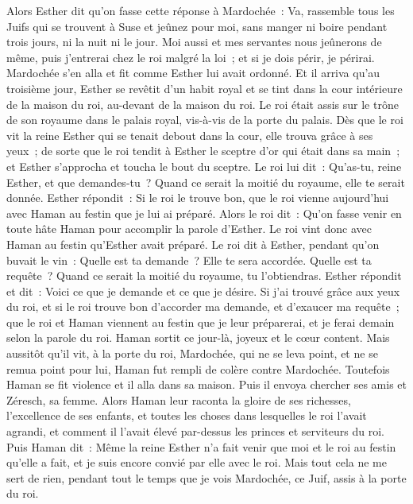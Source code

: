 \begin{multicols}{2}
Alors Esther dit qu'on fasse cette réponse à Mardochée~:
Va, rassemble tous les Juifs qui se trouvent à Suse et jeûnez pour moi, sans manger ni boire pendant trois jours, ni la nuit ni le jour. Moi aussi et mes servantes nous jeûnerons de même, puis j'entrerai chez le roi malgré la loi~; et si je dois périr, je périrai.
Mardochée s'en alla et fit comme Esther lui avait ordonné.
\VerseOne{}Et il arriva qu'au troisième jour, Esther se revêtit d'un habit royal et se tint dans la cour intérieure de la maison du roi, au-devant de la maison du roi. Le roi était assis sur le trône de son royaume dans le palais royal, vis-à-vis de la porte du palais.
Dès que le roi vit la reine Esther qui se tenait debout dans la cour, elle trouva grâce à ses yeux~; de sorte que le roi tendit à Esther le sceptre d'or qui était dans sa main~; et Esther s'approcha et toucha le bout du sceptre.
Le roi lui dit~: Qu'as-tu, reine Esther, et que demandes-tu~? Quand ce serait la moitié du royaume, elle te serait donnée.
Esther répondit~: Si le roi le trouve bon, que le roi vienne aujourd'hui avec Haman au festin que je lui ai préparé.
Alors le roi dit~: Qu'on fasse venir en toute hâte Haman pour accomplir la parole d'Esther. Le roi vint donc avec Haman au festin qu'Esther avait préparé.
Le roi dit à Esther, pendant qu'on buvait le vin~: Quelle est ta demande~? Elle te sera accordée. Quelle est ta requête~? Quand ce serait la moitié du royaume, tu l'obtiendras.
Esther répondit et dit~: Voici ce que je demande et ce que je désire.
Si j'ai trouvé grâce aux yeux du roi, et si le roi trouve bon d'accorder ma demande, et d'exaucer ma requête~; que le roi et Haman viennent au festin que je leur préparerai, et je ferai demain selon la parole du roi.
Haman sortit ce jour-là, joyeux et le cœur content. Mais aussitôt qu'il vit, à la porte du roi, Mardochée, qui ne se leva point, et ne se remua point pour lui, Haman fut rempli de colère contre Mardochée.
Toutefois Haman se fit violence et il alla dans sa maison. Puis il envoya chercher ses amis et Zéresch, sa femme.
Alors Haman leur raconta la gloire de ses richesses, l'excellence de ses enfants, et toutes les choses dans lesquelles le roi l'avait agrandi, et comment il l'avait élevé par-dessus les princes et serviteurs du roi.
Puis Haman dit~: Même la reine Esther n'a fait venir que moi et le roi au festin qu'elle a fait, et je suis encore convié par elle avec le roi.
Mais tout cela ne me sert de rien, pendant tout le temps que je vois Mardochée, ce Juif, assis à la porte du roi.

\end{multicols}
